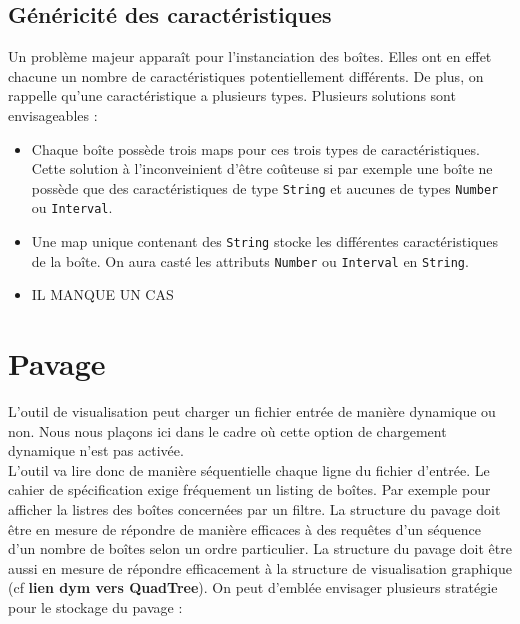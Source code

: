\subsection{Généricité des caractéristiques}
Un problème majeur apparaît pour l'instanciation des boîtes. Elles ont en effet chacune un nombre de caractéristiques potentiellement différents. De plus, on rappelle qu'une caractéristique a plusieurs types. Plusieurs solutions sont envisageables : 
\begin{itemize}
\item 
  Chaque boîte possède trois maps pour ces trois types de caractéristiques. Cette solution à l'inconveinient d'être coûteuse si par exemple une boîte ne possède que des caractéristiques de type \verb+String+ et aucunes de types \verb+Number+ ou \verb+Interval+. 
\item
  Une map unique contenant des \verb+String+ stocke les différentes caractéristiques de la boîte. On aura casté les attributs \verb+Number+ ou \verb+Interval+ en \verb+String+.
\item \huge{IL MANQUE UN CAS}
\end{itemize}


\section{Pavage}
L'outil de visualisation peut charger un fichier entrée de manière dynamique ou non. Nous nous plaçons ici dans le cadre où cette option de chargement dynamique n'est pas activée. \\ L'outil va lire donc de manière  séquentielle chaque ligne du fichier d'entrée. Le cahier de spécification exige fréquement un listing de boîtes. Par exemple pour afficher la listres des boîtes concernées par un filtre. La structure du pavage doit être en mesure de répondre de manière efficaces à des requêtes d'un séquence d'un nombre de  boîtes selon un ordre particulier. La structure du pavage doit être aussi en mesure de répondre efficacement à la structure  de visualisation graphique (cf \textbf{lien dym vers QuadTree}). On peut d'emblée envisager plusieurs stratégie pour le stockage du pavage :

